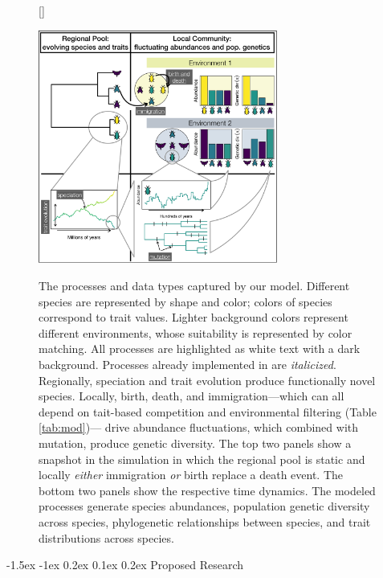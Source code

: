 \documentclass[11pt]{article}
\makeatletter
\renewcommand\section{\@startsection{section}{1}{\z@}%
                                  {-1.5ex \@plus -1ex \@minus 0.2ex}%
                                  {0.1ex \@plus 0.2ex}%
                                  {\normalfont\Large\bfseries}}
\makeatother
\begin{document}
\begin{figure}[!htb]
  [\FBwidth]
  {\caption{The processes and data types captured by our
      model. Different species are represented by shape and color;
      colors of species correspond to trait values. Lighter background
      colors represent different environments, whose suitability is
      represented by color matching. All processes are highlighted as
      white text with a dark background. Processes already implemented
      in \cite{Overcast2017-mf} are {\it italicized}. Regionally,
      speciation and trait evolution produce functionally novel
      species. Locally, birth, death, and immigration---which can all
      depend on tait-based competition and environmental filtering
      (Table \ref{tab:mod})--- drive abundance fluctuations, which
      combined with mutation, produce genetic diversity. The top two
      panels show a snapshot in the simulation in which the regional
      pool is static and locally {\it either} immigration {\it or}
      birth replace a death event. The bottom two panels show the
      respective time dynamics. The modeled processes generate species
      abundances, population genetic diversity across species,
      phylogenetic relationships between species, and trait
      distributions across species.}\label{fig:mod}}
  {\includegraphics[width=0.7\textwidth]{../fig_mod.pdf}}
\end{figure}


\section{Proposed Research}\label{proposed-research}
\end{document}
